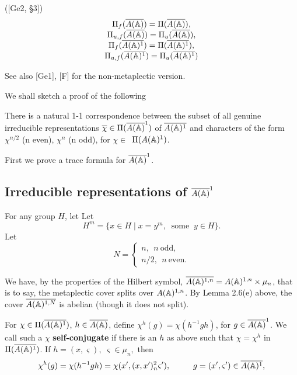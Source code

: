 \begin{lemma} ([Ge2, \S 3])
\[
\begin{array}{c}    
\Pi_f (\overline{A({\Bbb{A}})})=\Pi (\overline{A({\Bbb{A}})}),\\
\Pi_{u,f} (\overline{A({\Bbb{A}})})=\Pi_u (\overline{A({\Bbb{A}})}),\\
\Pi_f (\overline{A({\Bbb{A}})^1})=\Pi (\overline{A({\Bbb{A}})^1}),\\
\Pi_{u,f} (\overline{A({\Bbb{A}})^1})=\Pi_u (\overline{A({\Bbb{A}})^1})
\end{array}
\]
\end{lemma}

See also [Ge1], [F] for the non-metaplectic version.

We shall sketch a proof of the following

\begin{theorem}
There is a natural 1-1 correspondence between the subset of all genuine
irreducible representations
$\overline{\chi }\in \Pi (\overline{A({\Bbb{A}})}^1)$
of $\overline{A({\Bbb{A}})^1}$ and characters of the form
$\chi ^{n/2}$ (n even), $\chi ^n$ (n odd),
for $\chi \in $\ $\Pi (A({\Bbb{A}})^1)$.
\end{theorem}

First we prove a trace formula for $\overline{A({\Bbb{A}})}^1$.

\subsection{Irreducible representations of $\overline{A({\Bbb{A}})}^1$}

For any group $H$, let
Let 
\begin{equation}
H^m
=\{x\in H\;|\;x=y^m,\;\;\mathrm{some}
\;\;y\in H\}.
\end{equation}
Let 
\begin{equation}
N=
\left\{
\begin{array}{c}
n,\ \ n \mathrm{\ odd},\\
n/2,\ \ n \mathrm{\ even}.
\end{array}
\right.
\end{equation}

We have, by the properties of the Hilbert
symbol,
$\overline{A({{\Bbb{A}}})^{1,n}}=A({{\Bbb{A}}})^{1,n}\times \mu _n$,
that is to say, the metaplectic cover
splits over $A({{\Bbb{A}}})^{1,n}$.
By Lemma 2.6(e) above, the cover
$\overline{A({{\Bbb{A}}})^{1,N}}$ is abelian (though it
does not split).

For $\chi \in \Pi (\overline{A({\Bbb{A}})^1})$,
$h\in \overline{A({\Bbb{A}})}$, define
$\chi ^h(g)=\chi (h^{-1}gh)$, for $g\in 
\overline{A({\Bbb{A}})}^1$. We call such a
$\chi $ \textbf{self-conjugate} if
there is an $h$ as above such that $\chi =\chi ^h$
in $\Pi (\overline{A({\Bbb{A}})^1})$.
If $h=(x,\varsigma ),\;\varsigma \in \mu _n,$ then 
\[
\chi ^h(g)=\chi (h^{-1}gh)
=\chi (x^{\prime },(x,x^{\prime })_n^2\varsigma^{\prime }),
\;\;\;\;\;\;\;\;\;\;g=(x^{\prime },
\varsigma ^{\prime })\in \overline{A({\Bbb{A}})^1},
\]

